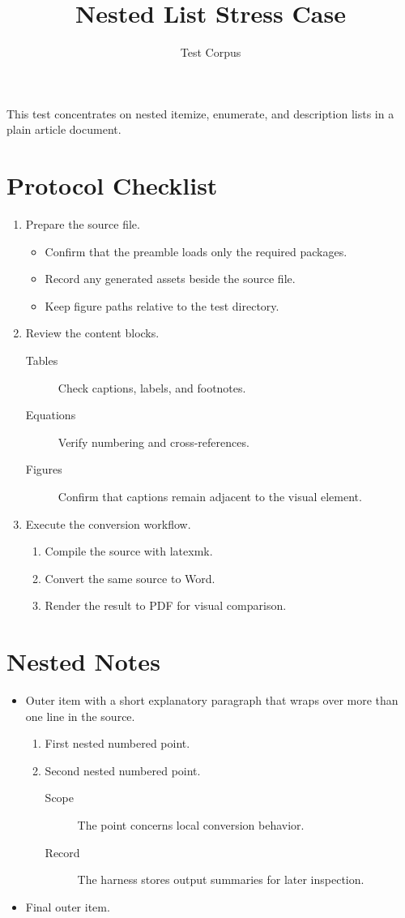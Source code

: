 \documentclass[11pt]{article}
\title{Nested List Stress Case}
\author{Test Corpus}
\date{}
\begin{document}
\maketitle

This test concentrates on nested itemize, enumerate, and description lists in a
plain article document.

\section{Protocol Checklist}

\begin{enumerate}
\item Prepare the source file.
  \begin{itemize}
  \item Confirm that the preamble loads only the required packages.
  \item Record any generated assets beside the source file.
  \item Keep figure paths relative to the test directory.
  \end{itemize}
\item Review the content blocks.
  \begin{description}
  \item[Tables] Check captions, labels, and footnotes.
  \item[Equations] Verify numbering and cross-references.
  \item[Figures] Confirm that captions remain adjacent to the visual element.
  \end{description}
\item Execute the conversion workflow.
  \begin{enumerate}
  \item Compile the source with latexmk.
  \item Convert the same source to Word.
  \item Render the result to PDF for visual comparison.
  \end{enumerate}
\end{enumerate}

\section{Nested Notes}

\begin{itemize}
\item Outer item with a short explanatory paragraph that wraps over more than one
line in the source.
  \begin{enumerate}
  \item First nested numbered point.
  \item Second nested numbered point.
    \begin{description}
    \item[Scope] The point concerns local conversion behavior.
    \item[Record] The harness stores output summaries for later inspection.
    \end{description}
  \end{enumerate}
\item Final outer item.
\end{itemize}
\end{document}
